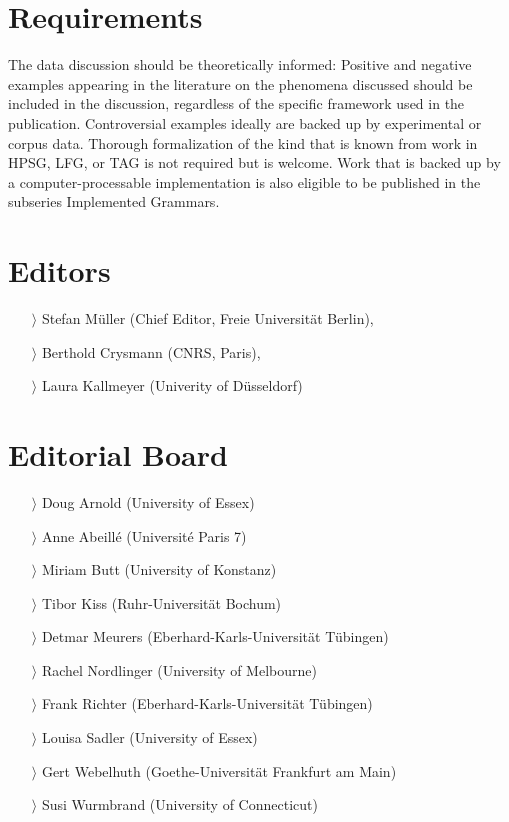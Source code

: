 \documentclass[
notumble,
nofoldmark,
]{leaflet}
\begin{document}
{
    \section{Requirements}   
\footnotesize
The data discussion should be theoretically informed: Positive and negative examples appearing in the literature on the phenomena discussed should be included in the discussion, regardless of the specific framework used in the publication. Controversial examples ideally are backed up by experimental or corpus data.
Thorough formalization of the kind that is known from work in HPSG, LFG, or TAG is not required but is welcome. Work that is backed up by a computer-processable implementation is also eligible to be published in the subseries Implemented Grammars.

    \section{Editors}   
    \begin{itemize}
    \item[$\rangle$] Stefan M\"uller (Chief Editor, Freie Universit\"at Berlin), 
    \item[$\rangle$] Berthold Crysmann (CNRS, Paris),
    \item[$\rangle$] Laura Kallmeyer (Univerity of D\"usseldorf)
\end{itemize}
    \section{Editorial Board}     
\begin{itemize}
    \item[$\rangle$] Doug Arnold (University of Essex)
    \item[$\rangle$] Anne Abeill\'e (Universit\'e Paris 7)
    \item[$\rangle$] Miriam Butt (University of Konstanz)
    \item[$\rangle$] Tibor Kiss (Ruhr-Universit\"at Bochum)
    \item[$\rangle$] Detmar Meurers (Eberhard-Karls-Universit\"at T\"ubingen)
    \item[$\rangle$] Rachel Nordlinger (University of Melbourne) 
    \item[$\rangle$] Frank Richter (Eberhard-Karls-Universit\"at T\"ubingen)
    \item[$\rangle$] Louisa Sadler (University of Essex)
    \item[$\rangle$] Gert Webelhuth (Goethe-Universit\"at Frankfurt am Main)
    \item[$\rangle$] Susi Wurmbrand (University of Connecticut)
    \end{itemize}}
\end{document}
